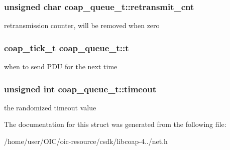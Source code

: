\subsubsection[{retransmit\+\_\+cnt}]{\setlength{\rightskip}{0pt plus 5cm}unsigned char coap\+\_\+queue\+\_\+t\+::retransmit\+\_\+cnt}\label{structcoap__queue__t_aff24f5a43b3d2182535bc7bd2b5f5341}
retransmission counter, will be removed when zero \hypertarget{structcoap__queue__t_ab5edd7b3b3ddd98d8356febbd4726e7c}{}
\subsubsection[{t}]{\setlength{\rightskip}{0pt plus 5cm}coap\+\_\+tick\+\_\+t coap\+\_\+queue\+\_\+t\+::t}\label{structcoap__queue__t_ab5edd7b3b3ddd98d8356febbd4726e7c}
when to send P\+D\+U for the next time \hypertarget{structcoap__queue__t_a4d8b47a02fea39b9a9fc0501f81cbaa2}{}
\subsubsection[{timeout}]{\setlength{\rightskip}{0pt plus 5cm}unsigned int coap\+\_\+queue\+\_\+t\+::timeout}\label{structcoap__queue__t_a4d8b47a02fea39b9a9fc0501f81cbaa2}
the randomized timeout value 

The documentation for this struct was generated from the following file\+:\begin{DoxyCompactItemize}
\item 
/home/user/\+O\+I\+C/oic-\/resource/csdk/libcoap-\/4../net.\+h\end{DoxyCompactItemize}
